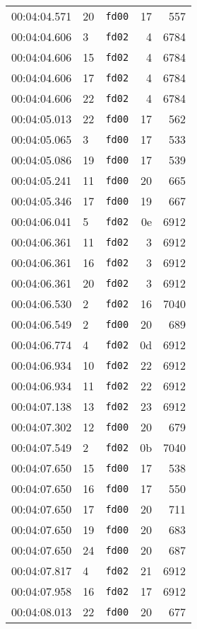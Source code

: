 \documentclass{article}
\begin{document}
\begin{longtable}{lllrr}
00:04:04.571 & 20 & \texttt{fd00} & 17 & 557 \\
00:04:04.606 & 3 & \texttt{fd02} & 4 & 6784 \\
00:04:04.606 & 15 & \texttt{fd02} & 4 & 6784 \\
00:04:04.606 & 17 & \texttt{fd02} & 4 & 6784 \\
00:04:04.606 & 22 & \texttt{fd02} & 4 & 6784 \\
00:04:05.013 & 22 & \texttt{fd00} & 17 & 562 \\
00:04:05.065 & 3 & \texttt{fd00} & 17 & 533 \\
00:04:05.086 & 19 & \texttt{fd00} & 17 & 539 \\
00:04:05.241 & 11 & \texttt{fd00} & 20 & 665 \\
00:04:05.346 & 17 & \texttt{fd00} & 19 & 667 \\
00:04:06.041 & 5 & \texttt{fd02} & 0e & 6912 \\
00:04:06.361 & 11 & \texttt{fd02} & 3 & 6912 \\
00:04:06.361 & 16 & \texttt{fd02} & 3 & 6912 \\
00:04:06.361 & 20 & \texttt{fd02} & 3 & 6912 \\
00:04:06.530 & 2 & \texttt{fd02} & 16 & 7040 \\
00:04:06.549 & 2 & \texttt{fd00} & 20 & 689 \\
00:04:06.774 & 4 & \texttt{fd02} & 0d & 6912 \\
00:04:06.934 & 10 & \texttt{fd02} & 22 & 6912 \\
00:04:06.934 & 11 & \texttt{fd02} & 22 & 6912 \\
00:04:07.138 & 13 & \texttt{fd02} & 23 & 6912 \\
00:04:07.302 & 12 & \texttt{fd00} & 20 & 679 \\
00:04:07.549 & 2 & \texttt{fd02} & 0b & 7040 \\
00:04:07.650 & 15 & \texttt{fd00} & 17 & 538 \\
00:04:07.650 & 16 & \texttt{fd00} & 17 & 550 \\
00:04:07.650 & 17 & \texttt{fd00} & 20 & 711 \\
00:04:07.650 & 19 & \texttt{fd00} & 20 & 683 \\
00:04:07.650 & 24 & \texttt{fd00} & 20 & 687 \\
00:04:07.817 & 4 & \texttt{fd02} & 21 & 6912 \\
00:04:07.958 & 16 & \texttt{fd02} & 17 & 6912 \\
00:04:08.013 & 22 & \texttt{fd00} & 20 & 677 \\

\end{longtable}
\end{document}
